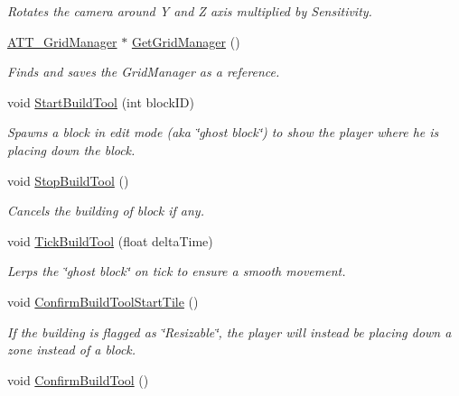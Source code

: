 \begin{DoxyCompactItemize}
\begin{DoxyCompactList}\small\item\em Rotates the camera around Y and Z axis multiplied by Sensitivity. \end{DoxyCompactList}\item 
\mbox{\hyperlink{class_a_t_t___grid_manager}{A\+T\+T\+\_\+\+Grid\+Manager}} $\ast$ \mbox{\hyperlink{class_a_t_t___player_grid_camera_ae4c11bb7a68a06a9f95e445db9ccc69f}{Get\+Grid\+Manager}} ()
\begin{DoxyCompactList}\small\item\em Finds and saves the Grid\+Manager as a reference. \end{DoxyCompactList}\item 
void \mbox{\hyperlink{class_a_t_t___player_grid_camera_a4b6f91d32b63d387425d22faa853895a}{Start\+Build\+Tool}} (int block\+ID)
\begin{DoxyCompactList}\small\item\em Spawns a block in edit mode (aka \char`\"{}ghost block\char`\"{}) to show the player where he is placing down the block. \end{DoxyCompactList}\item 
void \mbox{\hyperlink{class_a_t_t___player_grid_camera_aeab5a8ae1220466c3bd63d96cab019b4}{Stop\+Build\+Tool}} ()
\begin{DoxyCompactList}\small\item\em Cancels the building of block if any. \end{DoxyCompactList}\item 
void \mbox{\hyperlink{class_a_t_t___player_grid_camera_a67c2ba8b8b3f86ddddf25f3d11b70c8f}{Tick\+Build\+Tool}} (float delta\+Time)
\begin{DoxyCompactList}\small\item\em Lerps the \char`\"{}ghost block\char`\"{} on tick to ensure a smooth movement. \end{DoxyCompactList}\item 
void \mbox{\hyperlink{class_a_t_t___player_grid_camera_a8fd9c9e736603f9b0bf9768b2e8ac898}{Confirm\+Build\+Tool\+Start\+Tile}} ()
\begin{DoxyCompactList}\small\item\em If the building is flagged as \char`\"{}\+Resizable\char`\"{}, the player will instead be placing down a zone instead of a block. \end{DoxyCompactList}\item 
void \mbox{\hyperlink{class_a_t_t___player_grid_camera_aca622600a2b7f3a52b001c34a0da537b}{Confirm\+Build\+Tool}} ()

\end{DoxyCompactItemize}
